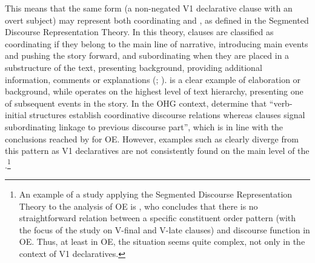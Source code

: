 \documentclass[output=paper,colorlinks,citecolor=brown]{langscibook}
\begin{document}
This means that the same form (a non-negated V1 declarative clause with an overt subject) may represent both coordinating and , as defined in the Segmented Discourse Representation Theory. In this theory, clauses are classified as coordinating if they belong to the main line of narrative, introducing main events and pushing the story forward, and subordinating when they are placed in a substructure of the text, presenting background, providing additional information, comments or explanations (\citealt{AsherLascarides2003}; \citealt{AsherVieu2005}).  is a clear example of elaboration or background, while  operates on the highest level of text hierarchy, presenting one of subsequent events in the story. In the OHG context, \citet[73]{HinterhölzlPetrova2005} determine that “verb-initial structures establish coordinative discourse relations whereas  clauses signal subordinating linkage to previous discourse part”, which is in line with the conclusions reached by \citet{Los2000} for OE. However, examples such as  clearly diverge from this pattern as V1 declaratives are not consistently found on the main level of the .\footnote{An example of a study applying the Segmented Discourse Representation Theory to the analysis of OE is \citet{Bech2012}, who concludes that there is no straightforward relation between a specific constituent order pattern (with the focus of the study on V-final and V-late clauses) and discourse function in OE. Thus, at least in OE, the situation seems quite complex, not only in the context of V1 declaratives.}
\end{document}
